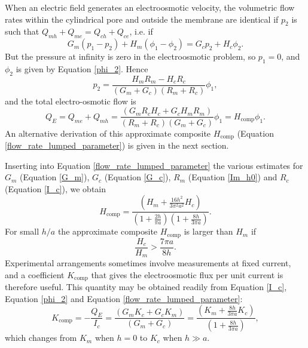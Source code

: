 When an electric field generates an electroosmotic velocity, the
volumetric flow rates within the cylindrical pore and outside the
membrane are identical if $p_2$ is such that $Q_{mh}+Q_{me}=Q_{ch}+Q_{ce}$,
i.e. if
\begin{equation}
G_m(p_1-p_2)+H_m(\phi_1-\phi_2)=G_cp_2+H_c\phi_2.
\end{equation}
But the pressure at infinity is zero in the electroosmotic problem, so
$p_1=0$, and $\phi_2$ is given by Equation \ref{phi_2}.
Hence
\begin{equation}
p_2=
\frac{H_mR_m-H_cR_c}{(G_m+G_c)(R_m+R_c)}\phi_1,
\end{equation}
and the total electro-osmotic flow is
\begin{equation}
Q_E=Q_{me}+Q_{mh}=
\frac{(G_mR_cH_c+G_cH_mR_m)}{(R_m+R_c)(G_m+G_c)}\phi_1=H_\text{comp}\phi_1.
\label{flow_rate_lumped_parameter}
\end{equation}
An alternative derivation of this approximate composite
$H_\text{comp}$ (Equation \ref{flow_rate_lumped_parameter}) is given in the next
section.

Inserting into Equation \ref{flow_rate_lumped_parameter}
the various estimates for $G_m$ (Equation \ref{G_m}), $G_c$ (Equation \ref{G_c}),
$R_m$ (Equation \ref{Im_h0}) and $R_c$ (Equation \ref{I_c}),
we obtain
\begin{equation}
H_\text{comp}=
\frac{\left(H_m+\frac{16 h^2}{3\pi^2a^2}H_c\right)}
{\left(1+\frac{2h}{\pi a}\right)
\left(1+\frac{8h}{3\pi a}\right)}.
\label{H_comp}
\end{equation}
For small $h/a$ the approximate composite $H_\text{comp}$
is
larger than $H_m$ if
\begin{equation}
\frac{H_c}{H_m}>\frac{7\pi a}{8h}.
\label{H_c_for_H_comp_increasing}
\end{equation}
Experimental arrangements sometimes involve measurements at fixed current,
and a coefficient $K_\text{comp}$ that gives the electroosmotic
flux per unit current is therefore useful.
This quantity may be obtained readily from Equation \ref{I_c}, Equation \ref{phi_2} and Equation \ref{flow_rate_lumped_parameter}:
\begin{equation} 
K_\text{comp} = - \frac{Q_E}{I_c} = 
\frac{(G_mK_c+G_cK_m)}{(G_m+G_c)} = 
\frac{\left(K_m+\frac{8h}{3\pi a}K_c\right)}
{\left(1+\frac{8h}{3\pi a}\right)},
\label{K_comp}
\end{equation}
which changes from $K_m$ when $h=0$ to $K_c$ when $h\gg a$.

